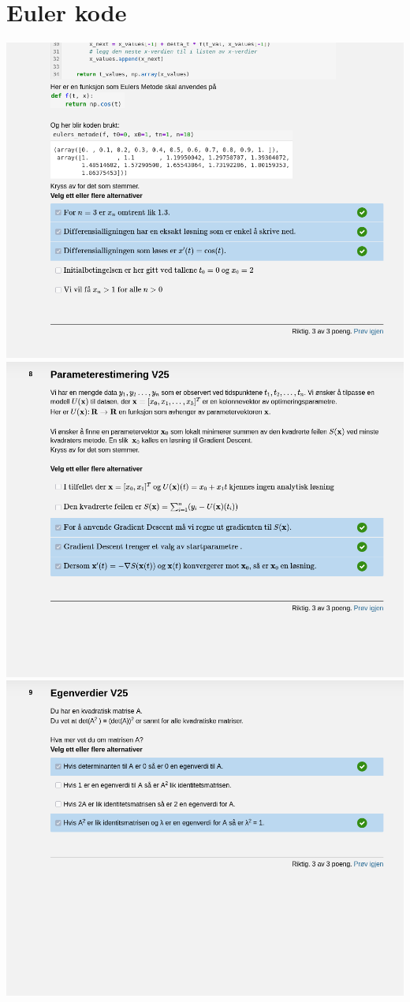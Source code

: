 \documentclass[12pt]{article}
\begin{document}
\section*{Euler kode}
\includegraphics[width=\textwidth]{Screenshot_20250521_134959.png}
\newpage
\includegraphics[width=\textwidth]{Screenshot_20250521_135046.png}
\newpage
\includegraphics[width=\textwidth]{Screenshot_20250521_135152.png}
\end{document}
